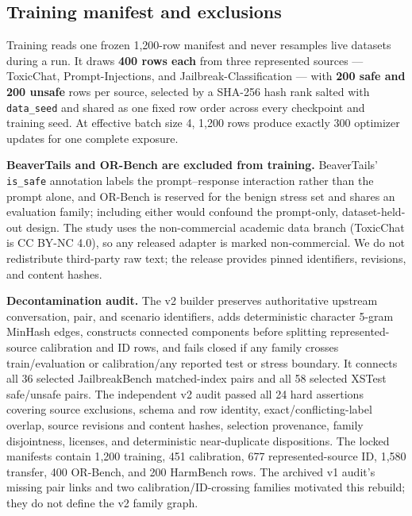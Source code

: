 \documentclass[11pt]{article}
\begin{document}
\subsection{Training manifest and exclusions}
\label{subsec:manifest}

Training reads one frozen 1{,}200-row manifest and never resamples live datasets during a run. It draws \textbf{400 rows each} from three represented sources --- ToxicChat, Prompt-Injections, and Jailbreak-Classification --- with \textbf{200 safe and 200 unsafe} rows per source, selected by a SHA-256 hash rank salted with \texttt{data\_seed} and shared as one fixed row order across every checkpoint and training seed. At effective batch size 4, 1{,}200 rows produce exactly 300 optimizer updates for one complete exposure.

\textbf{BeaverTails and OR-Bench are excluded from training.} BeaverTails' \cite{ji2023beavertails} \texttt{is\_safe} annotation labels the prompt--response interaction rather than the prompt alone, and OR-Bench is reserved for the benign stress set and shares an evaluation family; including either would confound the prompt-only, dataset-held-out design. The study uses the non-commercial academic data branch (ToxicChat is CC BY-NC 4.0), so any released adapter is marked non-commercial. We do not redistribute third-party raw text; the release provides pinned identifiers, revisions, and content hashes.

\textbf{Decontamination audit.} The v2 builder preserves authoritative upstream conversation, pair, and scenario identifiers, adds deterministic character 5-gram MinHash edges, constructs connected components before splitting represented-source calibration and ID rows, and fails closed if any family crosses train/evaluation or calibration/any reported test or stress boundary. It connects all 36 selected JailbreakBench matched-index pairs and all 58 selected XSTest safe/unsafe pairs. The independent v2 audit passed all 24 hard assertions covering source exclusions, schema and row identity, exact/conflicting-label overlap, source revisions and content hashes, selection provenance, family disjointness, licenses, and deterministic near-duplicate dispositions. The locked manifests contain 1{,}200 training, 451 calibration, 677 represented-source ID, 1{,}580 transfer, 400 OR-Bench, and 200 HarmBench rows. The archived v1 audit's missing pair links and two calibration/ID-crossing families motivated this rebuild; they do not define the v2 family graph.
\end{document}
